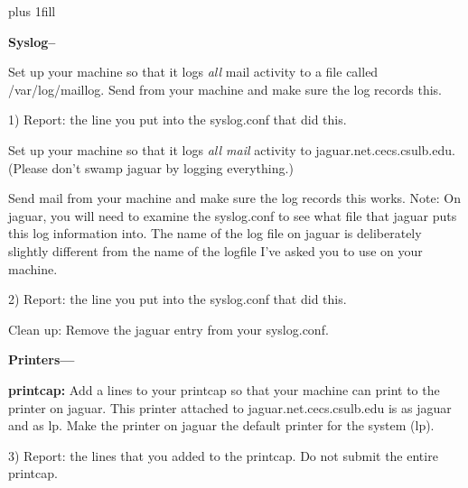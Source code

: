 
\rightskip=0pt plus 1fill

\parindent 0pt

{\bf Syslog--}

Set up your machine so that it logs {\it  all} mail activity to a file
called {\ltt{}/var/log/maillog}.
Send from your machine and make sure the log records this.

1) Report: the line you put into the syslog.conf that did this.

Set up your machine so that it logs {\it all mail} activity to 
{\ltt{}jaguar.net.cecs.csulb.edu}.
(Please don't swamp jaguar by logging everything.)

Send mail from your machine and make sure the log records this works.
Note: On {\ltt{}jaguar}, you will need to examine the {\ltt{}syslog.conf}
to see what file that {\ltt{}jaguar} puts this log information into.
The name of the log file on jaguar is deliberately slightly different from
the name of the logfile I've asked you to use on your machine.

2) Report: the line you put into the syslog.conf that did this.

Clean up: Remove the {\ltt{}jaguar} entry from your {\ltt{}syslog.conf}.


{\bf Printers---}

{\bf printcap:}
Add a lines to your printcap so that your machine can
print to the printer on jaguar.
This printer attached to {\ltt{}jaguar.net.cecs.csulb.edu} is
as {\ltt{}jaguar} and as {\ltt{}lp}.
Make the printer on {\ltt{}jaguar} the default printer for the system 
({\ltt{}lp}).

3) Report: the lines that you added to the printcap. 
Do not submit the entire printcap.

\bye

